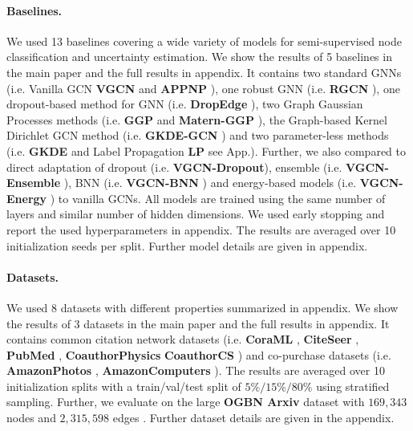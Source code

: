 \paragraph{Baselines.} We used 13 baselines covering a wide variety of models for semi-supervised node classification and uncertainty estimation. We show the results of 5 baselines in the main paper and the full results in appendix. It contains two standard GNNs (i.e. Vanilla GCN \textbf{VGCN} \citep{Kipf2016, Shchur2018} and \textbf{APPNP} \citep{Klicpera2018}), one robust GNN (i.e. \textbf{RGCN} \citep{Zhu2019}), one dropout-based method for GNN (i.e. \textbf{DropEdge} \citep{Rong2019}), two Graph Gaussian Processes methods (i.e. \textbf{GGP} \citep{Ng2018} and \textbf{Matern-GGP} \citep{Borovitskiy2020}), the Graph-based Kernel Dirichlet GCN method (i.e. \textbf{GKDE-GCN} \citep{Zhao2020}) and two parameter-less methods (i.e. \textbf{GKDE} \citep{Zhao2020} and Label Propagation \textbf{LP} see App.). Further, we also compared to direct adaptation of dropout (i.e. \textbf{VGCN-Dropout}\citep{Gal2016}), ensemble (i.e. \textbf{VGCN-Ensemble} \citep{Lakshminarayanan2017}), BNN (i.e. \textbf{VGCN-BNN} \citep{blundell2015}) and energy-based models (i.e. \textbf{VGCN-Energy} \citep{Liu2020a}) to vanilla GCNs. All models are trained using the same number of layers and similar number of hidden dimensions. We used early stopping and report the used hyperparameters in appendix. The results are averaged over 10 initialization seeds per split. Further model details are given in appendix.

\paragraph{Datasets.} We used 8 datasets with different properties summarized in appendix. We show the results of 3 datasets in the main paper and the full results in appendix. It contains common citation network datasets (i.e. \textbf{CoraML} \citep{Mccallum2000, Giles1998, Getoor2005, Sen2008a}, \textbf{CiteSeer} \citep{Giles1998, Getoor2005, Sen2008a}, \textbf{PubMed} \citep{Namata2012}, \textbf{CoauthorPhysics} \citep{Shchur2018} \textbf{CoauthorCS} \citep{Shchur2018})
 and co-purchase datasets (i.e. \textbf{AmazonPhotos} \citep{Mcauley2015, Shchur2018}, \textbf{AmazonComputers} \citep{Mcauley2015, Shchur2018}). The results are averaged over 10 initialization splits with a train/val/test split of $5\%/15\%/80\%$ using stratified sampling. Further, we evaluate on the large \textbf{OGBN Arxiv} dataset with $169,343$ nodes and $2,315,598$ edges \citep{ogb-dataset, microsoft-academic-graph}. Further dataset details are given in the appendix.
 
